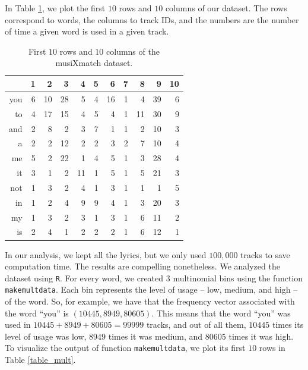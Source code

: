 \documentclass[12pt, reqno]{amsart}
\theoremstyle{definition}
\begin{document}

\iffalse
In Table \ref{data}, we plot the first $10$ rows and $10$ columns of our dataset. The rows correspond to words, the columns to track IDs, and the numbers are the number of time a given word is used in a given track.

\begin{table}[h!]
\centering
\begin{tabular}{rrrrrrrrrrr}
  \hline
 & 1 & 2 & 3 & 4 & 5 & 6 & 7 & 8 & 9 & 10 \\ 
  \hline
you & 6 & 10 & 28 & 5 & 4 & 16 & 1 & 4 & 39 & 6 \\ 
  to & 4 & 17 & 15 & 4 & 5 & 4 & 1 & 11 & 30 & 9 \\ 
  and & 2 & 8 & 2 & 3 & 7 & 1 & 1 & 2 & 10 & 3 \\ 
  a & 2 & 2 & 12 & 2 & 2 & 3 & 2 & 7 & 10 & 4 \\ 
  me & 5 & 2 & 22 & 1 & 4 & 5 & 1 & 3 & 28 & 4 \\ 
  it & 3 & 1 & 2 & 11 & 1 & 5 & 1 & 5 & 21 & 3 \\ 
  not & 1 & 3 & 2 & 4 & 1 & 3 & 1 & 1 & 1 & 5 \\ 
  in & 1 & 2 & 4 & 9 & 9 & 4 & 1 & 3 & 20 & 3 \\ 
  my & 1 & 3 & 2 & 3 & 1 & 3 & 1 & 6 & 11 & 2 \\ 
  is & 2 & 4 & 1 & 2 & 2 & 2 & 1 & 6 & 12 & 1 \\ 
   \hline
\end{tabular}
\caption{First $10$ rows and $10$ columns of the musiXmatch dataset.}
\label{data}
\end{table}


In our analysis, we kept all the lyrics, but we only used $100,000$ tracks to save computation time. The results are compelling nonetheless. We analyzed the dataset using \texttt{R}. For every word, we created $3$ multinomial bins using the function \texttt{makemultdata}. Each bin represents the level of usage -- low, medium, and high -- of the word. So, for example, we have that the frequency vector associated with the word ``you'' is $(10445, 8949, 80605)$. This means that the word ``you'' was used in $10445 + 8949 + 80605=99999$ tracks, and out of all them, $10445$ times its level of usage was low, $8949$ times it was medium, and $80605$ times it was high. To visualize the output of function \texttt{makemultdata}, we plot its first $10$ rows in Table \ref{table_mult}.
\end{document}
